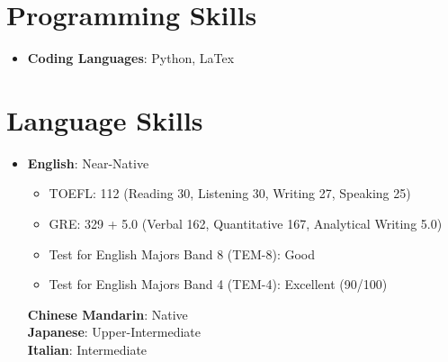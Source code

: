 \documentclass[a4paper,11pt]{article}
\newcommand{\resumeItem}[1]{
  \item\small{
    {#1 \vspace{-2pt}}
  }
}
\newcommand{\resumeItemListStart}{\begin{itemize}}
\newcommand{\resumeItemListEnd}{\end{itemize}\vspace{-5pt}}
\begin{document}
\section{Programming Skills}
 \begin{itemize}[leftmargin=0.15in, label={}]
    \item{
     \textbf{Coding Languages}{: Python, LaTex}
     }
 \end{itemize}

\section{Language Skills}
\begin{itemize}[leftmargin=0.15in, label={}]
  \item{
   \textbf{English}{: Near-Native}\vspace{-5pt}
      \resumeItemListStart
        \resumeItem{TOEFL: 112 (Reading 30, Listening 30, Writing 27, Speaking 25)}
        \resumeItem{GRE: 329 + 5.0 (Verbal 162, Quantitative 167, Analytical Writing 5.0)}
        \resumeItem{Test for English Majors Band 8 (TEM-8): Good}
        \resumeItem{Test for English Majors Band 4 (TEM-4): Excellent (90/100)}
      \resumeItemListEnd
  \textbf{Chinese Mandarin}{: Native} \\
  \textbf{Japanese}{: Upper-Intermediate} \\
  \textbf{Italian}{: Intermediate}
   }
\end{itemize}


\end{document}
